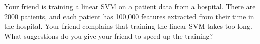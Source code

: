 Your friend is training a linear SVM on a patient data from a hospital. There are 2000 patients, and each patient has 100,000 features extracted from their time in the hospital. Your friend complains that training the linear SVM takes too long. What suggestions do you give your friend to speed up the training?

